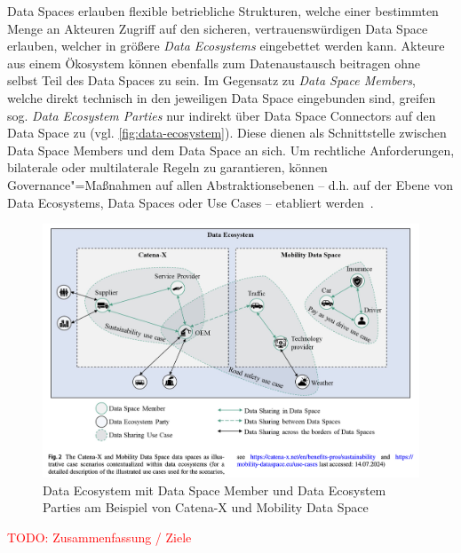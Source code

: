 Data Spaces erlauben flexible betriebliche Strukturen, welche einer bestimmten Menge an Akteuren Zugriff auf den sicheren, vertrauenswürdigen Data Space erlauben, welcher in größere \emph{Data Ecosystems} eingebettet werden kann.
Akteure aus einem Ökosystem können ebenfalls zum Datenaustausch beitragen ohne selbst Teil des Data Spaces zu sein.
Im Gegensatz zu \emph{Data Space Members}, welche direkt technisch in den jeweiligen Data Space eingebunden sind, greifen sog. \emph{Data Ecosystem Parties} nur indirekt über Data Space Connectors auf den Data Space zu (vgl. \autoref{fig:data-ecosystem}).
Diese dienen als Schnittstelle zwischen Data Space Members und dem Data Space an sich.
Um rechtliche Anforderungen, bilaterale oder multilaterale Regeln zu garantieren, können Governance"=Maßnahmen auf allen Abstraktionsebenen -- d.h. auf der Ebene von Data Ecosystems, Data Spaces oder Use Cases -- etabliert werden~\cite{mollerIndustrialDataEcosystems2024}.

\begin{figure}
    \includegraphics[width=\textwidth]{./assets/moller_data_ecosystem.png}
    \caption{Data Ecosystem mit Data Space Member und Data Ecosystem Parties am Beispiel von Catena-X und Mobility Data Space~\cite{mollerIndustrialDataEcosystems2024}}
    \label{fig:data-ecosystem}
\end{figure}

\textcolor{red}{TODO: Zusammenfassung / Ziele}
